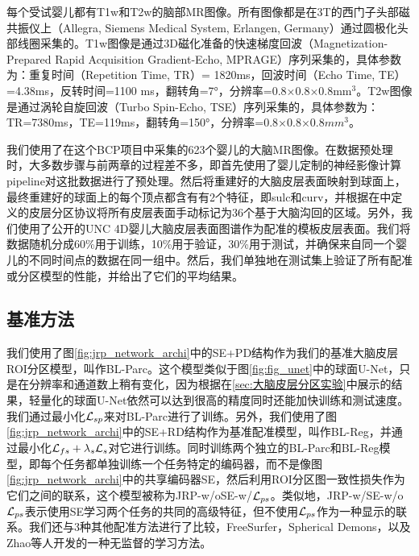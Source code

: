 每个受试婴儿都有T1w和T2w的脑部MR图像。所有图像都是在3T的西门子头部磁共振仪上（Allegra, Siemens Medical System, Erlangen, Germany）通过圆极化头部线圈采集的。T1w图像是通过3D磁化准备的快速梯度回波（Magnetization-Prepared Rapid Acquisition Gradient-Echo, MPRAGE）序列采集的，具体参数为：重复时间（Repetition Time, TR）= 1820ms，回波时间（Echo Time, TE）=4.38ms，反转时间=1100 ms，翻转角=7°，分辨率=0.8×0.8×0.8mm$^3$。T2w图像是通过涡轮自旋回波（Turbo Spin-Echo, TSE）序列采集的，具体参数为：TR=7380ms，TE=119ms，翻转角=150°，分辨率=0.8×0.8×0.8$mm^3$。

我们使用了在这个BCP项目中采集的623个婴儿的大脑MR图像。在数据预处理时，大多数步骤与前两章的过程差不多，即首先使用了婴儿定制的神经影像计算pipeline\cite{li2019computational}对这批数据进行了预处理。然后将重建好的大脑皮层表面映射到球面上\cite{fischl2012freesurfer}，最终重建好的球面上的每个顶点都含有有2个特征，即sulc和curv，并根据在\cite{desikan2006automated}中定义的皮层分区协议将所有皮层表面手动标记为36个基于大脑沟回的区域。另外，我们使用了公开的UNC 4D婴儿大脑皮层表面图谱\cite{li2015construction}作为配准的模板皮层表面。我们将数据随机分成60\%用于训练，10\%用于验证，30\%用于测试，并确保来自同一个婴儿的不同时间点的数据在同一组中。然后，我们单独地在测试集上验证了所有配准或分区模型的性能，并给出了它们的平均结果。

\subsection{基准方法}
我们使用了图\ref{fig:jrp_network_archi}中的SE+PD结构作为我们的基准大脑皮层ROI分区模型，叫作BL-Parc。这个模型类似于图\ref{fig:fig_unet}中的球面U-Net，只是在分辨率和通道数上稍有变化，因为根据在\ref{sec:大脑皮层分区实验}中展示的结果，轻量化的球面U-Net依然可以达到很高的精度同时还能加快训练和测试速度。我们通过最小化${\cal L}_{sp}$来对BL-Parc进行了训练。另外，我们使用了图\ref{fig:jrp_network_archi}中的SE+RD结构作为基准配准模型，叫作BL-Reg，并通过最小化${\cal L}_{fs}+\lambda_s{\cal L}_s$对它进行训练。同时训练两个独立的BL-Parc和BL-Reg模型，即每个任务都单独训练一个任务特定的编码器，而不是像图\ref{fig:jrp_network_archi}中的共享编码器SE，然后利用ROI分区图一致性损失作为它们之间的联系，这个模型被称为JRP-w/oSE-w/${\cal L}_{ps}$。类似地，JRP-w/SE-w/o${\cal L}_{ps}$表示使用SE学习两个任务的共同的高级特征，但不使用${\cal L}_{ps}$作为一种显示的联系。我们还与3种其他配准方法进行了比较，FreeSurfer\cite{fischl1999high}，Spherical Demons\cite{yeo2009spherical}，以及Zhao等人开发的一种无监督的学习方法\cite{zhao2020unsupervised}。

